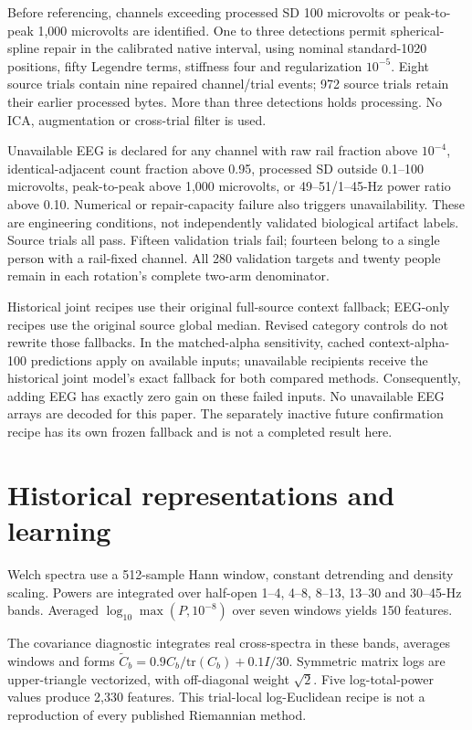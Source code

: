 \documentclass[10pt,a4paper]{article}
\begin{document}
Before referencing, channels exceeding processed SD 100 microvolts or peak-to-peak 1,000 microvolts are identified. One to three detections permit spherical-spline repair in the calibrated native interval, using nominal standard-1020 positions, fifty Legendre terms, stiffness four and regularization \(10^{-5}\). Eight source trials contain nine repaired channel/trial events; 972 source trials retain their earlier processed bytes. More than three detections holds processing. No ICA, augmentation or cross-trial filter is used.

Unavailable EEG is declared for any channel with raw rail fraction above \(10^{-4}\), identical-adjacent count fraction above 0.95, processed SD outside 0.1--100 microvolts, peak-to-peak above 1,000 microvolts, or 49--51/1--45-Hz power ratio above 0.10. Numerical or repair-capacity failure also triggers unavailability. These are engineering conditions, not independently validated biological artifact labels. Source trials all pass. Fifteen validation trials fail; fourteen belong to a single person with a rail-fixed channel. All 280 validation targets and twenty people remain in each rotation's complete two-arm denominator.

Historical joint recipes use their original full-source context fallback; EEG-only recipes use the original source global median. Revised category controls do not rewrite those fallbacks. In the matched-alpha sensitivity, cached context-alpha-100 predictions apply on available inputs; unavailable recipients receive the historical joint model's exact fallback for both compared methods. Consequently, adding EEG has exactly zero gain on these failed inputs. No unavailable EEG arrays are decoded for this paper. The separately inactive future confirmation recipe has its own frozen fallback and is not a completed result here.

\section{Historical representations and learning}
Welch spectra use a 512-sample Hann window, constant detrending and density scaling. Powers are integrated over half-open 1--4, 4--8, 8--13, 13--30 and 30--45-Hz bands. Averaged \(\log_{10}\max(P,10^{-8})\) over seven windows yields 150 features.

The covariance diagnostic integrates real cross-spectra in these bands, averages windows and forms \(\widetilde C_b=0.9C_b/\mathrm{tr}(C_b)+0.1I/30\). Symmetric matrix logs are upper-triangle vectorized, with off-diagonal weight \(\sqrt{2}\). Five log-total-power values produce 2,330 features. This trial-local log-Euclidean recipe is not a reproduction of every published Riemannian method.
\end{document}
